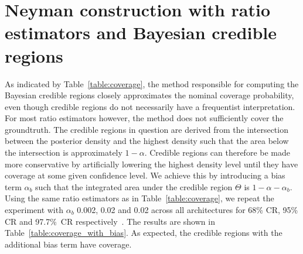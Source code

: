 \documentclass[fleqn,usenatbib]{mnras}
\begin{document}
\section{Neyman construction with ratio estimators and Bayesian credible regions}
\label{appendix:sec:cr_bias}
As indicated by Table~\ref{table:coverage}, the method responsible for computing the Bayesian credible regions
closely approximates the nominal coverage probability, even though credible regions
do not necessarily have a frequentist interpretation. For most ratio estimators however,
the method does not sufficiently cover the groundtruth.
The credible regions in question are derived from the intersection
between the posterior density and the highest density
such that the area below the intersection is approximately $1 - \alpha$.
Credible regions can therefore be made more conservative
by artificially lowering the highest density level until they have
coverage at some given confidence level.
We achieve this by introducing a bias term $\alpha_b$ such that
the integrated area under the credible region $\Theta$ is $1 - \alpha - \alpha_b$.
Using the same ratio estimators as in Table~\ref{table:coverage}, we repeat the
experiment with $\alpha_b$ 0.002, 0.02 and 0.02 across all architectures for 68\% CR, 95\% CR and 97.7\%\ CR
respectively~\protect{}.
The results are shown in Table~\ref{table:coverage_with_bias}.
As expected, the credible regions with the additional bias term have coverage.
\end{document}
